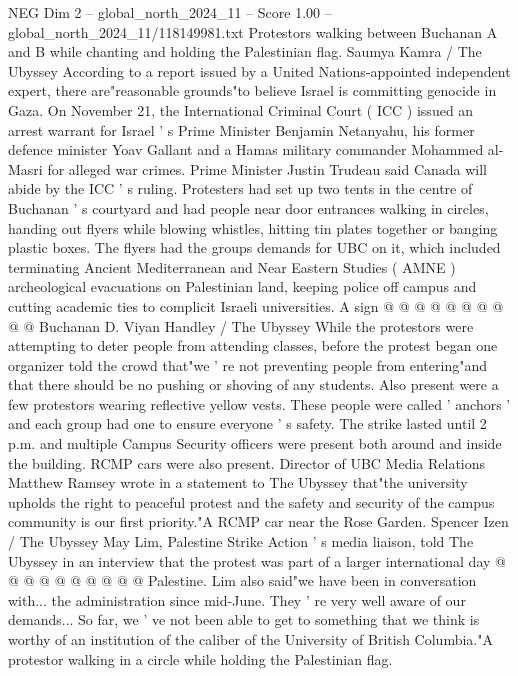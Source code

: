 \begin{textsample}{NEG Dim 2 – global\_north\_2024\_11 – Score 1.00 – global\_north\_2024\_11/118149981.txt}  \label{ex:f2_neg_093}
Protestors walking between Buchanan A and B while chanting and holding the Palestinian flag.
Saumya Kamra / The Ubyssey According to a report issued by a United Nations-appointed independent expert, there are"reasonable grounds"to believe Israel is committing genocide in Gaza.
On November 21, the International Criminal Court ( ICC ) issued an arrest warrant for Israel ' s Prime Minister Benjamin Netanyahu, his former defence minister Yoav Gallant and a Hamas military commander Mohammed al-Masri for alleged war crimes.
Prime Minister Justin Trudeau said Canada will abide by the ICC ' s ruling.
Protesters had set up two tents in the centre of Buchanan ' s courtyard and had people near door entrances walking in circles, handing out flyers while blowing whistles, hitting tin plates together or banging plastic boxes.
The flyers had the groups demands for UBC on it, which included terminating Ancient Mediterranean and Near Eastern Studies ( AMNE ) archeological evacuations on Palestinian land, keeping police off campus and cutting academic ties to complicit Israeli universities.
A sign @ @ @ @ @ @ @ @ @ @ Buchanan D.
Viyan Handley / The Ubyssey While the protestors were attempting to deter people from attending classes, before the protest began one organizer told the crowd that"we ' re not preventing people from entering"and that there should be no pushing or shoving of any students.
Also present were a few protestors wearing reflective yellow vests.
These people were called ' anchors ' and each group had one to ensure everyone ' s safety.
The strike lasted until 2 p.m. and multiple Campus Security officers were present both around and inside the building.
RCMP cars were also present.
Director of UBC Media Relations Matthew Ramsey wrote in a statement to The Ubyssey that"the university upholds the right to peaceful protest and the safety and security of the campus community is our first priority."A RCMP car near the Rose Garden.
Spencer Izen / The Ubyssey May Lim, Palestine Strike Action ' s media liaison, told The Ubyssey in an interview that the protest was part of a larger international day @ @ @ @ @ @ @ @ @ @ Palestine.
Lim also said"we have been in conversation with... the administration since mid-June.
They ' re very well aware of our demands...
So far, we ' ve not been able to get to something that we think is worthy of an institution of the caliber of the University of British Columbia."A protestor walking in a circle while holding the Palestinian flag.

\end{textsample}
